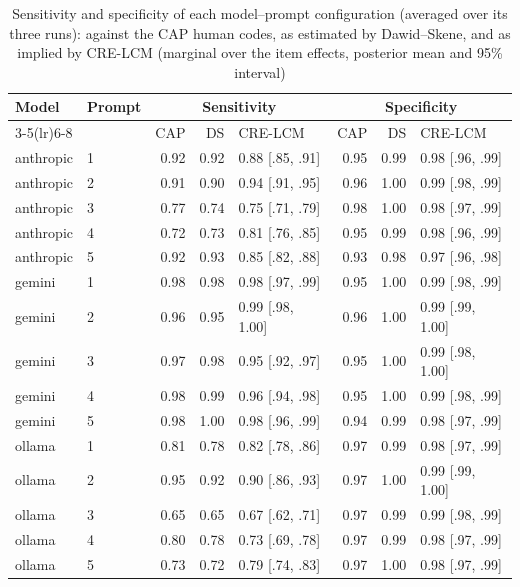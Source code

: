 \begin{table}[htbp]
\centering
\tiny
\setlength{\tabcolsep}{2.5pt}
\caption{Sensitivity and specificity of each model--prompt configuration (averaged over its three runs): against the CAP human codes, as estimated by Dawid--Skene, and as implied by CRE-LCM (marginal over the item effects, posterior mean and 95\% interval)}\label{tab:app_percfg}
\begin{tabular}{llrrlrrl}
\toprule
Model & Prompt & \multicolumn{3}{c}{Sensitivity} & \multicolumn{3}{c}{Specificity} \\
\cmidrule(lr){3-5}\cmidrule(lr){6-8}
 & & CAP & DS & CRE-LCM & CAP & DS & CRE-LCM \\
\midrule
anthropic & 1 & 0.92 & 0.92 & 0.88 [.85, .91] & 0.95 & 0.99 & 0.98 [.96, .99] \\
anthropic & 2 & 0.91 & 0.90 & 0.94 [.91, .95] & 0.96 & 1.00 & 0.99 [.98, .99] \\
anthropic & 3 & 0.77 & 0.74 & 0.75 [.71, .79] & 0.98 & 1.00 & 0.98 [.97, .99] \\
anthropic & 4 & 0.72 & 0.73 & 0.81 [.76, .85] & 0.95 & 0.99 & 0.98 [.96, .99] \\
anthropic & 5 & 0.92 & 0.93 & 0.85 [.82, .88] & 0.93 & 0.98 & 0.97 [.96, .98] \\
gemini & 1 & 0.98 & 0.98 & 0.98 [.97, .99] & 0.95 & 1.00 & 0.99 [.98, .99] \\
gemini & 2 & 0.96 & 0.95 & 0.99 [.98, 1.00] & 0.96 & 1.00 & 0.99 [.99, 1.00] \\
gemini & 3 & 0.97 & 0.98 & 0.95 [.92, .97] & 0.95 & 1.00 & 0.99 [.98, 1.00] \\
gemini & 4 & 0.98 & 0.99 & 0.96 [.94, .98] & 0.95 & 1.00 & 0.99 [.98, .99] \\
gemini & 5 & 0.98 & 1.00 & 0.98 [.96, .99] & 0.94 & 0.99 & 0.98 [.97, .99] \\
ollama & 1 & 0.81 & 0.78 & 0.82 [.78, .86] & 0.97 & 0.99 & 0.98 [.97, .99] \\
ollama & 2 & 0.95 & 0.92 & 0.90 [.86, .93] & 0.97 & 1.00 & 0.99 [.99, 1.00] \\
ollama & 3 & 0.65 & 0.65 & 0.67 [.62, .71] & 0.97 & 0.99 & 0.99 [.98, .99] \\
ollama & 4 & 0.80 & 0.78 & 0.73 [.69, .78] & 0.97 & 0.99 & 0.98 [.97, .99] \\
ollama & 5 & 0.73 & 0.72 & 0.79 [.74, .83] & 0.97 & 1.00 & 0.98 [.97, .99] \\
\bottomrule
\end{tabular}
\end{table}
